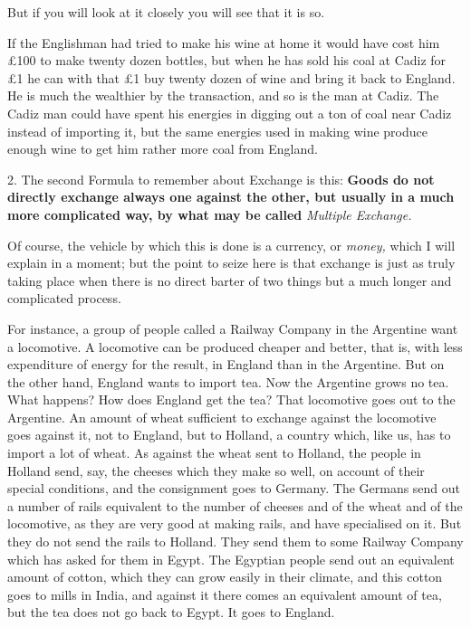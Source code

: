 \documentclass{book}
\begin{document}
But if you will look at it closely you will see that it is so.

If the Englishman had tried to make his wine at home it would have cost him £100 to make twenty dozen bottles, but when he has sold his coal at Cadiz for £1 he can with that £1 buy twenty dozen of wine and bring it back to England. He is much the wealthier by the transaction, and so is the man at Cadiz. The Cadiz man could have spent his energies in digging out a ton of coal near Cadiz instead of importing it, but the same energies used in making wine produce enough wine to get him rather more coal from England.

2. The second Formula to remember about Exchange is this: \textbf{Goods do not directly exchange always one against the other, but usually in a much more complicated way, by what may be called} \emph{Multiple Exchange.}

Of course, the vehicle by which this is done is a currency, or \emph{money,} which I will explain in a moment; but the point to seize here is that exchange is just as truly taking place when there is no direct barter of two things but a much longer and complicated process.

For instance, a group of people called a Railway Company in the Argentine want a locomotive. A locomotive can be produced cheaper and better, that is, with less expenditure of energy for the result, in England than in the Argentine. But on the other hand, England wants to import tea. Now the Argentine grows no tea. What happens? How does England get the tea? That locomotive goes out to the Argentine. An amount of wheat sufficient to exchange against the locomotive goes against it, not to England, but to Holland, a country which, like us, has to import a lot of wheat. As against the wheat sent to Holland, the people in Holland send, say, the cheeses which they make so well, on account of their special conditions, and the consignment goes to Germany. The Germans send out a number of rails equivalent to the number of cheeses and of the wheat and of the locomotive, as they are very good at making rails, and have specialised on it. But they do not send the rails to Holland. They send them to some Railway Company which has asked for them in Egypt. The Egyptian people send out an equivalent amount of cotton, which they can grow easily in their climate, and this cotton goes to mills in India, and against it there comes an equivalent amount of tea, but the tea does not go back to Egypt. It goes to England.
\end{document}
